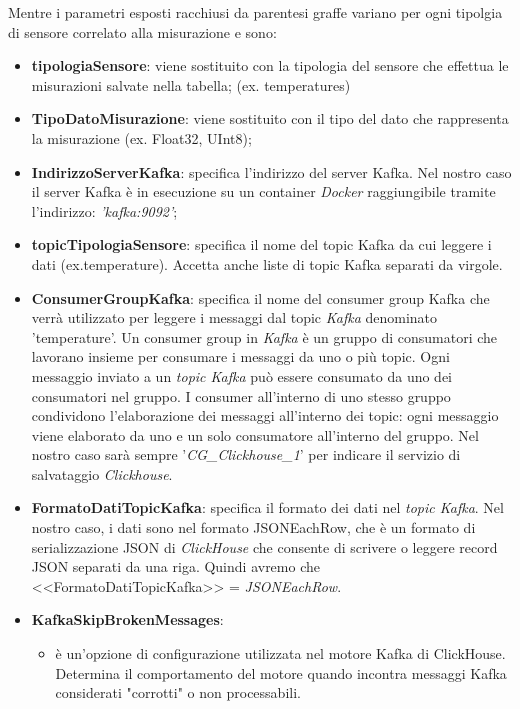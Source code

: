     Mentre i parametri esposti racchiusi da parentesi graffe variano per ogni tipolgia di sensore correlato alla misurazione e sono:
    \begin{itemize}
        \item \textbf{tipologiaSensore}: viene sostituito con la tipologia del sensore che effettua le misurazioni salvate nella tabella; (ex. temperatures)
        \item \textbf{TipoDatoMisurazione}: viene sostituito con il tipo del dato che rappresenta la misurazione (ex. Float32, UInt8);
        \item \textbf{IndirizzoServerKafka}: specifica l'indirizzo del server Kafka.
        Nel nostro caso il server Kafka è in esecuzione su un container \textit{Docker} raggiungibile tramite l'indirizzo:
         \textit{'kafka:9092'};
        \item \textbf{topicTipologiaSensore}: specifica il nome del topic Kafka da cui leggere i dati (ex.temperature). Accetta anche liste di topic Kafka separati da virgole.
        \item \textbf{ConsumerGroupKafka}: specifica il nome del consumer group Kafka che verrà utilizzato per leggere i messaggi dal topic \textit{Kafka} denominato 'temperature'.
        Un consumer group in \textit{Kafka} è un gruppo di consumatori che lavorano insieme per consumare i messaggi da uno o più topic. Ogni messaggio inviato a un \textit{topic Kafka} può essere consumato da uno dei consumatori nel gruppo. I consumer all'interno di uno stesso gruppo condividono l'elaborazione dei messaggi all'interno dei topic: ogni messaggio viene elaborato da uno e un solo consumatore all'interno del gruppo. Nel nostro caso sarà sempre '\textit{CG\_Clickhouse\_1}' per indicare il servizio di salvataggio \textit{Clickhouse}.
        \item \textbf{FormatoDatiTopicKafka}: specifica il formato dei dati nel \textit{topic Kafka}. Nel nostro caso, i dati sono nel formato JSONEachRow, che è un formato di serializzazione JSON di \textit{ClickHouse} che consente di scrivere o leggere record JSON separati da una riga. Quindi avremo che <<FormatoDatiTopicKafka>> = \textit{JSONEachRow}.
        \item \textbf{KafkaSkipBrokenMessages}:
        \begin{itemize}
          \item è un'opzione di configurazione utilizzata nel motore Kafka di ClickHouse. Determina il comportamento del motore quando incontra messaggi Kafka considerati "corrotti" o non processabili.

\end{itemize}
\end{itemize}
